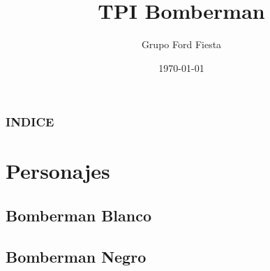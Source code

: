 \documentclass{beamer}
\title[Bomberman]{TPI Bomberman} %
\author{Grupo Ford Fiesta} %
\institute[UTN FRBA] %
{
Universidad Tecnológica Nacional -FRBA \\ %
\medskip
\textit{Tobias Duren} %
\newline
\textit{Jose Miguel Paz Portilla} %
\newline
\textit{Lucas Ezequiel Fernandez Fiel} %
}
\date{\today} %
\begin{document}
\begin{frame}
\titlepage %
\end{frame}

\begin{frame}
\frametitle{INDICE} %
\tableofcontents %
\end{frame}


\section{Personajes} %

\subsection{Bomberman Blanco} %
\subsection{Bomberman Negro}
\end{document}
